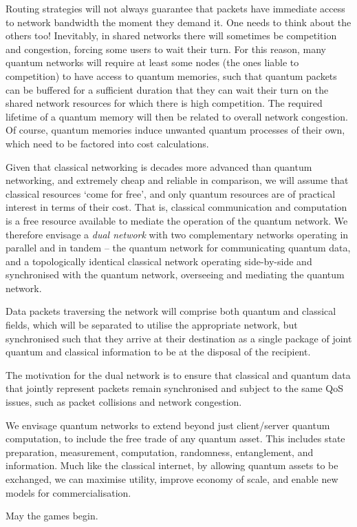 Routing strategies will not always guarantee that packets have immediate access to network bandwidth the moment they demand it. One needs to think about the others too! Inevitably, in shared networks there will sometimes be competition and congestion, forcing some users to wait their turn. For this reason, many quantum networks will require at least some nodes (the ones liable to competition) to have access to quantum memories, such that quantum packets can be buffered for a sufficient duration that they can wait their turn on the shared network resources for which there is high competition. The required lifetime of a quantum memory will then be related to overall network congestion. Of course, quantum memories induce unwanted quantum processes of their own, which need to be factored into cost calculations.

Given that classical networking is decades more advanced than quantum networking, and extremely cheap and reliable in comparison, we will assume that classical resources `come for free', and only quantum resources are of practical interest in terms of their cost. That is, classical communication and computation is a free resource available to mediate the operation of the quantum network. We therefore envisage a \textit{dual network} with two complementary networks operating in parallel and in tandem -- the quantum network for communicating quantum data, and a topologically identical classical network operating side-by-side and synchronised with the quantum network, overseeing and mediating the quantum network.

Data packets traversing the network will comprise both quantum and classical fields, which will be separated to utilise the appropriate network, but synchronised such that they arrive at their destination as a single package of joint quantum and classical information to be at the disposal of the recipient.

The motivation for the dual network is to ensure that classical and quantum data that jointly represent packets remain synchronised and subject to the same QoS issues, such as packet collisions and network congestion.

We envisage quantum networks to extend beyond just client/server quantum computation, to include the free trade of any quantum asset. This includes state preparation, measurement, computation, randomness, entanglement, and information. Much like the classical internet, by allowing quantum assets to be exchanged, we can maximise utility, improve economy of scale, and enable new models for commercialisation.

May the games begin.
